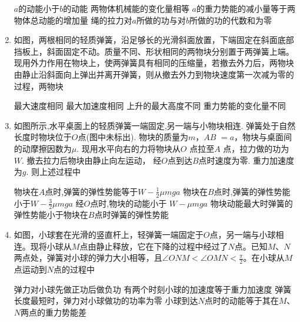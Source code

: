\begin{enumerate}[leftmargin=0em]
\fourchoices
{$ a $的动能小于$ b $的动能}
{两物体机械能的变化量相等}
{$ a $的重力势能的减小量等于两物体总动能的增加量}
{绳的拉力对$ a $所做的功与对$ b $所做的功的代数和为零}



\item 
{}
如图，两根相同的轻质弹簧，沿足够长的光滑斜面放置，下端固定在斜面底部挡板上，斜面固定不动。质量不同、形状相同的两物块分别置于两弹簧上端。现用外力作用在物块上，使两弹簧具有相同的压缩量，若撤去外力后，两物块由静止沿斜面向上弹出并离开弹簧，则从撤去外力到物块速度第一次减为零的过程，两物块  
\begin{figure}[h!]
\centering

\end{figure}

\fourchoices
{最大速度相同 }
{最大加速度相同}
{上升的最大高度不同 }
{重力势能的变化量不同}



\item
{}
如图所示,水平桌面上的轻质弹簧一端固定,另一端与小物块相连. 弹簧处于自然长度时物块位于$ O $点(图中未标出). 物块的质量为$ m $，$ AB $ $ =a $，物块与桌面间的动摩擦因数为$ \mu $. 现用水平向右的力将物块从$ O $ 点拉至$ A $ 点，拉力做的功为$ W $. 撤去拉力后物块由静止向左运动， 经$ O $点到达$ B $点时速度为零. 重力加速度为$ g $. 则上述过程中  
\begin{figure}[h!]
\centering

\end{figure}


\fourchoices
{物块在$ A $点时,弹簧的弹性势能等于$W - \frac { 1 } { 2 } \mu m g a$}
{物块在$ B $点时,弹簧的弹性势能小于$W - \frac { 3 } { 2 } \mu m g a$}
{经$ O $点时,物块的动能小于 $W - \mu m g a$}
{物块动能最大时弹簧的弹性势能小于物块在$ B $点时弹簧的弹性势能}




\item
{}
如图，小球套在光滑的竖直杆上，轻弹簧一端固定于$ O $点，另一端与小球相连。现将小球从$ M $点由静止释放，它在下降的过程中经过了$ N $点。已知$ M $、$ N $两点处，弹簧对小球的弹力大小相等，且$ \angle ONM< \angle OMN< \frac{\pi}{2} $。在小球从$ M $点运动到$ N $点的过程中  


\begin{minipage}[h!]{0.7\linewidth}
\vspace{0.3em}
\fourchoices
{弹力对小球先做正功后做负功}
{有两个时刻小球的加速度等于重力加速度}
{弹簧长度最短时，弹力对小球做功的功率为零}
{小球到达$ N $点时的动能等于其在$ M $、$ N $两点的重力势能差}


\end{minipage}
\end{enumerate}
